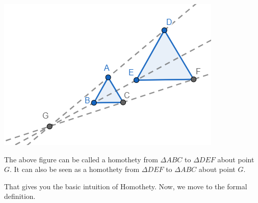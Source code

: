 \documentclass[12pt]{article}
\theoremstyle{definition}
\begin{document}
\begin{center}
    \includegraphics[]{images/Screenshot 2023-03-16 233654.png}
\end{center}
The above figure can be called a homothety from $\Delta ABC$ to $\Delta DEF$ about point $G$. It can also be seen as a homothety from $\Delta DEF$ to $\Delta ABC$ about point $G$.

That gives you the basic intuition of Homothety. Now, we move to the formal definition.
\end{document}

